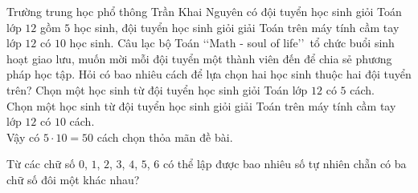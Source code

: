 \begin{bt}%
	Trường trung học phổ thông Trần Khai Nguyên có đội tuyển học sinh giỏi Toán lớp $12$ gồm $5$ học sinh, đội tuyển học sinh giỏi giải Toán trên máy tính cầm tay lớp $12$ có $10$ học sinh. Câu lạc bộ Toán \lq\lq Math - soul of life\rq\rq\ tổ chức buổi sinh hoạt giao lưu, muốn mời mỗi đội tuyển một thành viên đến để chia sẻ phương pháp học tập. Hỏi có bao nhiêu cách để lựa chọn hai học sinh thuộc hai đội tuyển trên?
	\loigiai
	{
		Chọn một học sinh từ đội tuyển học sinh giỏi Toán lớp $12$ có $5$ cách.\\
		Chọn một học sinh từ đội tuyển học sinh giỏi giải Toán trên máy tính cầm tay lớp $12$ có $10$ cách.\\
		Vậy có $5\cdot 10=50$ cách chọn thỏa mãn đề bài.
	}
\end{bt}

\begin{bt}%
	Từ các chữ số $0$, $1$, $2$, $3$, $4$, $5$, $6$ có thể lập được bao nhiêu số tự nhiên chẵn có ba chữ số đôi một khác nhau?
\end{bt}

